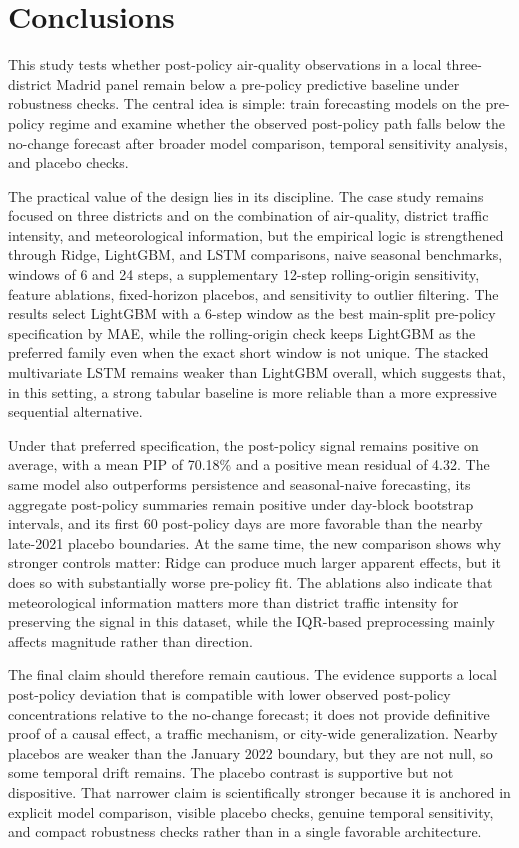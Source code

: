 \section{Conclusions}\label{sec:conclusions}

This study tests whether post-policy air-quality observations in a local three-district Madrid panel remain below a pre-policy predictive baseline under robustness checks. The central idea is simple: train forecasting models on the pre-policy regime and examine whether the observed post-policy path falls below the no-change forecast after broader model comparison, temporal sensitivity analysis, and placebo checks.

The practical value of the design lies in its discipline. The case study remains focused on three districts and on the combination of air-quality, district traffic intensity, and meteorological information, but the empirical logic is strengthened through Ridge, LightGBM, and LSTM comparisons, naive seasonal benchmarks, windows of 6 and 24 steps, a supplementary 12-step rolling-origin sensitivity, feature ablations, fixed-horizon placebos, and sensitivity to outlier filtering. The results select LightGBM with a 6-step window as the best main-split pre-policy specification by MAE, while the rolling-origin check keeps LightGBM as the preferred family even when the exact short window is not unique. The stacked multivariate LSTM remains weaker than LightGBM overall, which suggests that, in this setting, a strong tabular baseline is more reliable than a more expressive sequential alternative.

Under that preferred specification, the post-policy signal remains positive on average, with a mean PIP of 70.18\% and a positive mean residual of 4.32. The same model also outperforms persistence and seasonal-naive forecasting, its aggregate post-policy summaries remain positive under day-block bootstrap intervals, and its first 60 post-policy days are more favorable than the nearby late-2021 placebo boundaries. At the same time, the new comparison shows why stronger controls matter: Ridge can produce much larger apparent effects, but it does so with substantially worse pre-policy fit. The ablations also indicate that meteorological information matters more than district traffic intensity for preserving the signal in this dataset, while the IQR-based preprocessing mainly affects magnitude rather than direction.

The final claim should therefore remain cautious. The evidence supports a local post-policy deviation that is compatible with lower observed post-policy concentrations relative to the no-change forecast; it does not provide definitive proof of a causal effect, a traffic mechanism, or city-wide generalization. Nearby placebos are weaker than the January 2022 boundary, but they are not null, so some temporal drift remains. The placebo contrast is supportive but not dispositive. That narrower claim is scientifically stronger because it is anchored in explicit model comparison, visible placebo checks, genuine temporal sensitivity, and compact robustness checks rather than in a single favorable architecture.

